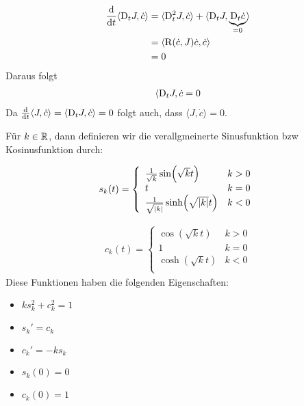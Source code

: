 \begin{bew}
\begin{align*}
    \dv{t} \langle \mathrm{D}_t J, \dot{c} \rangle &= \langle \mathrm{D}^2_t J, \dot{c} \rangle + \langle \mathrm{D}_t J , \underbrace{\mathrm{D}_t \dot{c}}_{=0} \rangle \\
&= \langle \operatorname{R} (\dot{c} , J) \dot{c} , \dot{c} \rangle \\
&= 0
\end{align*}
Daraus folgt
\begin{align*}
    \langle \mathrm{D}_t J, \dot{c} = 0
\end{align*}
Da $\dv{t} \langle J , \dot{c} \rangle = \langle \mathrm{D}_t J , \dot{c} \rangle = 0$
folgt auch, dass $\langle J , \dot{c} \rangle = 0$.
\end{bew}

\begin{defs}

    Für $k\in\mathbb{R}$, dann definieren wir die verallgmeinerte Sinusfunktion bzw 
    Kosinusfunktion durch:

\begin{align*}
    s_k(t) = \left\{
\begin{array}{ll}
    \frac{1}{\sqrt{k}} \sin (\sqrt{k} t) & k > 0 \\
    t & k = 0 \\
    \frac{1}{\sqrt{\abs{k}}} \sinh (\sqrt{\abs{k}} t) & k < 0 \\
\end{array}
\right.
\end{align*}

\begin{align*}
    c_k(t) = \left\{
\begin{array}{ll}
    \cos (\sqrt{k} t) & k > 0 \\
    1 & k = 0 \\
    \cosh (\sqrt{k} t) & k < 0 \\
\end{array}
\right.
\end{align*}
Diese Funktionen haben die folgenden Eigenschaften:
\begin{itemize}
    \item $k s^2_k + c^2_k = 1$
    \item $s_k' = c_k$
    \item $c_k' = - k s_k$
    \item $s_k(0) = 0$
    \item $c_k(0) = 1$
\end{itemize}
\end{defs}

